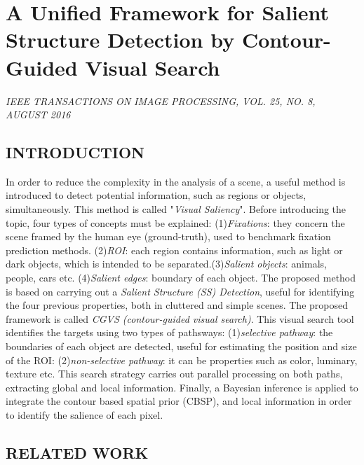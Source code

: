 \section{A Unified Framework for Salient Structure Detection by Contour-Guided Visual Search}

\begin{flushright}
    \author{
    Kai Fu Yang,
    Hui Li,
    Chao-Yi Li,
    and Young-Jie Li,
   \emph{Member}, 
    IEEE 
}
\end{flushright}

\begin{center}
    \emph{IEEE TRANSACTIONS ON IMAGE PROCESSING, VOL. 25, NO. 8, AUGUST 2016}
\end{center}

\subsection{INTRODUCTION}
In order to reduce the complexity in the analysis of a scene, a useful method 
is introduced to detect potential information, such as regions or 
objects, simultaneously. This method is called "\emph{Visual Saliency}". Before introducing
the topic, four types of concepts must be explained: (1)\emph{Fixations}: 
they concern the scene framed by the human eye (ground-truth), used to benchmark 
fixation prediction methods. (2)\emph{ROI}: each region contains information, such 
as light or dark objects, which is intended to be separated.(3)\emph{Salient objects}: 
animals, people, cars etc. (4)\emph{Salient edges}: boundary of each object. The proposed 
method is based on carrying out a \emph{Salient Structure (SS) Detection},
useful for identifying the four previous properties, both in cluttered and 
simple scenes. The proposed framework is called \emph{CGVS (contour-guided visual 
search)}. This visual search tool identifies the targets using two types of 
pathsways: (1)\emph{selective pathway}: the boundaries of each object are detected, useful 
for estimating the position and size of the ROI: (2)\emph{non-selective pathway}: it 
can be properties such as color, luminary, texture etc. This search strategy 
carries out parallel processing on both paths, extracting global and local 
information. Finally, a Bayesian inference is applied to integrate the contour 
based spatial prior (CBSP), and local information in order to identify 
the salience of each pixel. 

\subsection{RELATED WORK}

